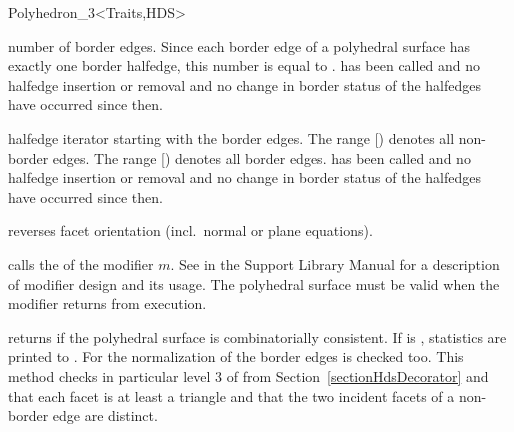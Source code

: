 \begin{ccClassTemplate}{Polyhedron_3<Traits,HDS>}
\begin{ccAdvanced}
    {number of border edges. Since each border edge of a polyhedral
    surface has exactly one border halfedge,
    this number is equal to .
    \ccPrecond {} has been called and no
    halfedge insertion or removal and no change in border
    status of the halfedges have occurred since then.}

    {halfedge iterator starting with the border edges. The range
      [) denotes
    all non-border edges. The range
    [) denotes all
    border edges.
    \ccPrecond {} has been called and no
    halfedge insertion or removal and no change in border
    status of the halfedges have occurred since then.}

\end{ccAdvanced}


    {reverses facet orientation (incl.\ normal or plane equations).}

\begin{ccAdvanced}
    {calls the  of the modifier $m$. See
     in the Support Library Manual for a
    description of modifier design and its usage.
    \ccPrecond The polyhedral surface must be valid when the modifier
    returns from execution.}
\end{ccAdvanced}

   {returns  if the polyhedral surface is combinatorially 
    consistent. If  is , statistics are
    printed to . For  the normalization of the
    border edges is checked too. This method checks in particular level 3 of
     from
    Section~\ref{sectionHdsDecorator} and that each facet is at least
    a triangle and that the two incident facets of a non-border edge are
    distinct.}



\end{ccClassTemplate}
